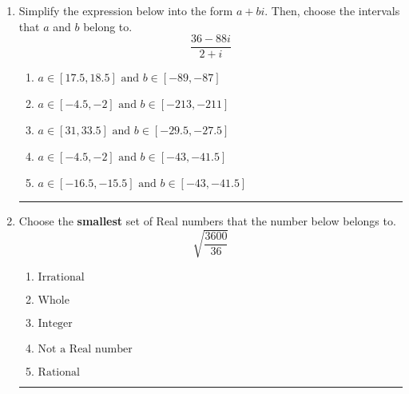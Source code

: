 \documentclass[14pt]{extbook}
\newcommand{\litem}[1]{\item#1\hspace*{-1cm}\rule{\textwidth}{0.4pt}}
\begin{document}
\begin{enumerate}
{\begin{enumerate}[label=\Alph*.]
\end{enumerate} }
\litem{
Simplify the expression below into the form $a+bi$. Then, choose the intervals that $a$ and $b$ belong to.\[ \frac{36 - 88 i}{2 + i} \]\begin{enumerate}[label=\Alph*.]
\item \( a \in [17.5, 18.5] \text{ and } b \in [-89, -87] \)
\item \( a \in [-4.5, -2] \text{ and } b \in [-213, -211] \)
\item \( a \in [31, 33.5] \text{ and } b \in [-29.5, -27.5] \)
\item \( a \in [-4.5, -2] \text{ and } b \in [-43, -41.5] \)
\item \( a \in [-16.5, -15.5] \text{ and } b \in [-43, -41.5] \)

\end{enumerate} }
\litem{
Choose the \textbf{smallest} set of Real numbers that the number below belongs to.\[ \sqrt{\frac{3600}{36}} \]\begin{enumerate}[label=\Alph*.]
\item \( \text{Irrational} \)
\item \( \text{Whole} \)
\item \( \text{Integer} \)
\item \( \text{Not a Real number} \)
\item \( \text{Rational} \)

\end{enumerate} }
\end{enumerate}
\end{document}
